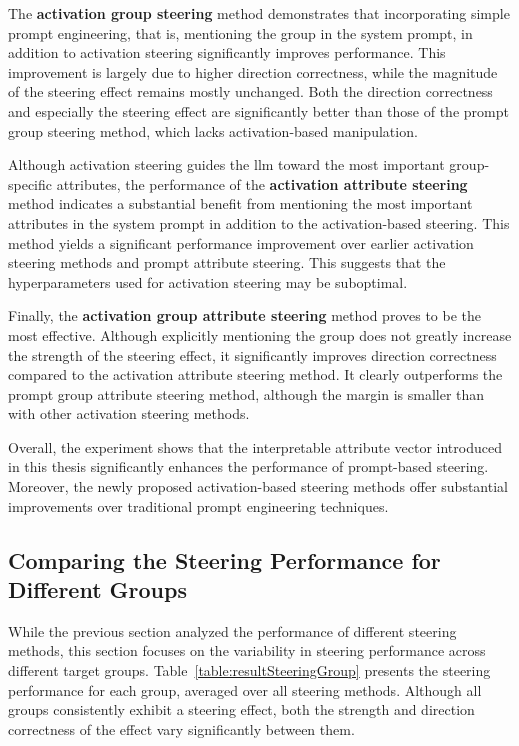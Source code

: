 The \textbf{activation group steering} method demonstrates that incorporating simple prompt engineering, that is, mentioning the group in the system prompt, in addition to activation steering significantly improves performance. This improvement is largely due to higher direction correctness, while the magnitude of the steering effect remains mostly unchanged. Both the direction correctness and especially the steering effect are significantly better than those of the prompt group steering method, which lacks activation-based manipulation.

Although activation steering guides the \ac{llm} toward the most important group-specific attributes, the performance of the \textbf{activation attribute steering} method indicates a substantial benefit from mentioning the most important attributes in the system prompt in addition to the activation-based steering. This method yields a significant performance improvement over earlier activation steering methods and prompt attribute steering. This suggests that the hyperparameters used for activation steering may be suboptimal.

Finally, the \textbf{activation group attribute steering} method proves to be the most effective. Although explicitly mentioning the group does not greatly increase the strength of the steering effect, it significantly improves direction correctness compared to the activation attribute steering method. It clearly outperforms the prompt group attribute steering method, although the margin is smaller than with other activation steering methods.

Overall, the experiment shows  that the interpretable attribute vector introduced in this thesis significantly enhances the performance of prompt-based steering. Moreover, the newly proposed activation-based steering methods offer substantial improvements over traditional prompt engineering techniques.


\subsection{Comparing the Steering Performance for Different Groups}%
\label{sec:evaluation:steering:groups}

While the previous section analyzed the performance of different steering methods, this section focuses on the variability in steering performance across different target groups. Table~\ref{table:resultSteeringGroup} presents the steering performance for each group, averaged over all steering methods. Although all groups consistently exhibit a steering effect, both the strength and direction correctness of the effect vary significantly between them.

